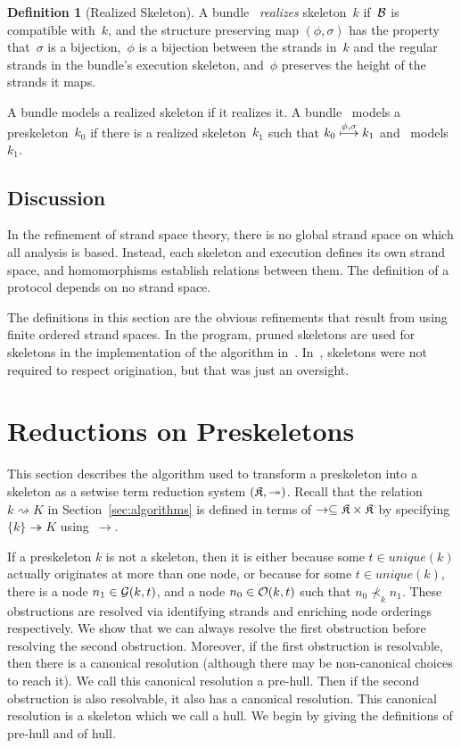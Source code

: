 \documentclass[12pt]{article}
\theoremstyle{definition}
\newtheorem{defn}{Definition}[section]
\begin{document}
\begin{defn}[Realized Skeleton]
A bundle~{\bundle} \emph{realizes} skeleton~$k$ if~$\mathcal{B}$ is
compatible with~$k$, and the structure preserving map $(\phi,\sigma)$
has the property that~$\sigma$ is a bijection,~$\phi$ is a
bijection between the strands in~$k$ and the regular strands in the
bundle's execution skeleton, and~$\phi$ preserves the height of the
strands it maps.
\end{defn}

A bundle models a realized skeleton if it realizes it.  A
bundle~{\bundle} models a preskeleton~$k_0$ if there is a realized
skeleton~$k_1$ such that $k_0\stackrel{\phi,\sigma}{\longmapsto} k_1$
and~{\bundle} models~$k_1$.

\subsection*{Discussion}

In the refinement of strand space theory, there is no global strand
space on which all analysis is based.  Instead, each skeleton and
execution defines its own strand space, and homomorphisms establish
relations between them.  The definition of a protocol depends on no
strand space.

The definitions in this section are the obvious refinements that
result from using finite ordered strand spaces.  In the {\cpsa}
program, pruned skeletons are used for skeletons in the implementation
of the {\cpsa} algorithm in~\cite{DoghmiGuttmanThayer07}.
In~\cite{DoghmiGuttmanThayer07}, skeletons were not required to
respect origination, but that was just an oversight.

\section{Reductions on Preskeletons}\label{sec:preskeleton reduction}

This section describes the algorithm used to transform a preskeleton
into a skeleton as a setwise term reduction system
$(\mathfrak K,\twoheadrightarrow)$.  Recall that the relation
$k\rightsquigarrow K$ in Section~\ref{sec:algorithms} is defined in
terms of $\to\subseteq\mathfrak K\times\mathfrak K$ by specifying
$\{k\}\twoheadrightarrow K$ using~$\to$.

If a preskeleton $k$ is not a skeleton, then it is either because
some $t\in unique(k)$ actually originates at more than one node,
or because for some $t\in unique(k)$, there is a node $n_1\in\mathcal{G}(k,t)$,
and a node $n_0\in\mathcal{O}(k,t)$ such that $n_0\nprec_k n_1$.
These obstructions are resolved via identifying strands and
enriching node orderings respectively.  We show that we can always
resolve the first obstruction before resolving the second obstruction.
Moreover, if the first obstruction is resolvable, then there is a
canonical resolution (although there may be non-canonical choices
to reach it).  We call this canonical resolution a pre-hull.  Then
if the second obstruction is also resolvable, it also has a canonical
resolution.  This canonical resolution is a skeleton which we call
a hull.  We begin by giving the definitions of pre-hull and of hull.
\end{document}
